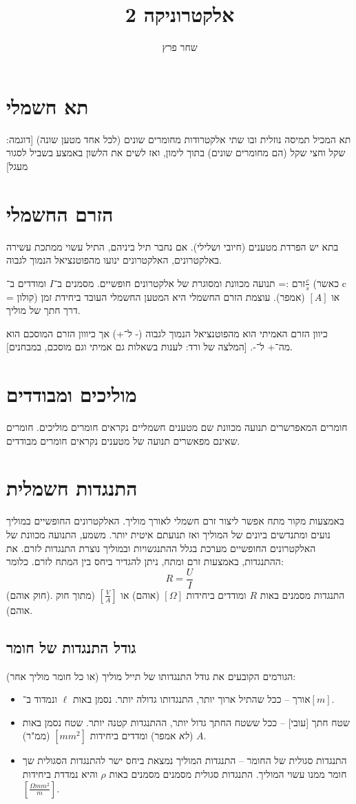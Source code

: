 \documentclass[]{article}
\author{שחר פרץ}
\title{אלקטרוניקה 2}
\begin{document}
	\maketitle
	\section{תא חשמלי}
	תא המכיל תמיסה נוזלית ובו שתי אלקטרודות מחומרים שונים (לכל אחד מטען שונה) [דוגמה: שקל וחצי שקל (הם מחומרים שונים) בתוך לימון, ואז לשים את הלשון באמצע בשביל לסגור מעגל] 
	\section{הזרם החשמלי}
	בתא יש הפרדת מטענים (חיובי ושלילי). אם נחבר תיל ביניהם, התיל עשוי ממתכת עשירה באלקטרונים, האלקטרונים ינועו מהפוטנציאל הנמוך לגבוה. 
	
	זרם := תנועה מכוונת ומסוגרת של אלקטרונים חופשיים. מסמנים ב־$I$ ומודדים ב־$\frac{c}{s}$ (כאשר c = קולון) או $[A]$ (אמפר). עוצמת הזרם החשמלי היא המטען החשמלי העובד ביחידת זמן דרך חתך של מוליך. 
	
	כיוון הזרם האמיתי הוא מהפוטנציאל הנמוך לגבוה (- ל־+) אך כיווון הזרם המוסכם הוא מה־+ ל־-. [המלצה של ורד: לענות בשאלות גם אמיתי וגם מוסכם, במבחנים]. 
	
	\section{מוליכים ומבודדים}
	חומרים המאפרשרים תנועה מכוונת שם מטענים חשמליים נקראים חומרים מוליכים. חומרים שאינם מפאשרים תנועה של מטענים נקראים חומרים מבודדים. 
	
	\section{התנגדות חשמלית}
	באמצעות מקור מתח אפשר ליצור זרם חשמלי לאורך מוליך. האלקטרונים החופשיים במוליך נועים ומתנדשים ביונים של המוליך ואז תנועתם איטית יותר. משמע, התנועה מכוונת של האלקטרונים החופשיים מערכת בגלל ההתנגשויות ובמוליך נוצרת התנגדות לזרם. את ההתנגדות, באמצעות זרם ומתח, ניתן להגדיר ביחס בין המתח לזרם. כלומר: 
	\[ R = \frac{U}{I} \]
	(חוק אוהם). התנגדות מסמנים באות $R$ ומודדים ביחידות $[\Omega]$ (אוהם) או $[\frac{V}{A}]$ (מתוך חוק אוהם). 
	\subsection{גודל התנגדות של חומר}
	הגורמים הקובעים את גודל התנגדותו של תייל מוליך (או כל חומר מוליך אחר): 
	\begin{itemize}
		\item אורך – ככל שהתיל ארוך יותר, התנגדותו גדולה יותר. נסמן באות $\ell$ ונמדוד ב־$[m]$. 
		\item שטח חתך [עובי] – ככל ששטח החתך גדול יותר, ההתנגדות קטנה יותר. שטח נסמן באות $A$ (\textit{לא} אמפר) ומדדים ביחידות $[mm^2]$ (ממ"ר). 
		\item התנגדות סגולית של החומר – התנגדות המוליך נמצאת ביחס ישר להתנגדות הסגולית שך חומר ממנו עשוי המוליך. התנגדות סגולית מסמנים מסמנים באות $\rho$ והיא נמדדת ביחידות $[\frac{\Omega mm^2}{m}]$. 
	\end{itemize}
	
\end{document}

